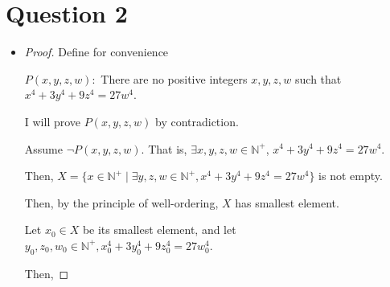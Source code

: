 \documentclass[12pt]{article}
\begin{document}
\bigskip

\section*{Question 2}

\bigskip

\begin{itemize}
    \item

    \begin{proof}
    Define for convenience

    \begin{center}
        $P(x,y,z,w):$ There are no positive integers $x,y,z,w$ such that $x^4 + 3y^4 + 9z^4 = 27w^4$.
    \end{center}

    \bigskip

    I will prove $P(x,y,z,w)$ by contradiction.

    \bigskip

    Assume $\neg P(x,y,z,w)$. That is, $\exists x,y,z,w \in \mathbb{N}^+$,
    $x^4 + 3y^4 + 9z^4 = 27w^4$.

    \bigskip

    Then, $X = \{x \in \mathbb{N}^+ \mid \exists y,z,w \in \mathbb{N}^+, x^4+3y^4+9z^4 = 27w^4\}$
    is not empty.

    \bigskip

    Then, by the principle of well-ordering, $X$ has smallest element.

    \bigskip

    Let $x_0 \in X$ be its smallest element, and let $y_0,z_0,w_0 \in \mathbb{N}^+,
    x_0^4+3y_0^4+9z_0^4 = 27w_0^4$.

    \bigskip

    Then,


\end{proof}
\end{itemize}
\end{document}
